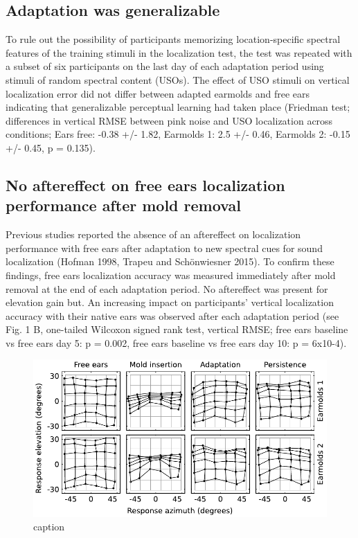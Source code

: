  \subsection{Adaptation was generalizable}

To rule out the possibility of participants memorizing location-specific spectral features of the training stimuli in the localization test, the test was repeated with a subset of six participants on the last day of each adaptation period using stimuli of random spectral content (USOs). The effect of USO stimuli on vertical localization error did not differ between adapted earmolds and free ears indicating that generalizable perceptual learning had taken place (Friedman test; differences in vertical RMSE between pink noise and USO localization across conditions; Ears free: -0.38 +/- 1.82, Earmolds 1: 2.5 +/- 0.46, Earmolds 2: -0.15 +/- 0.45, p = 0.135).

 \subsection{No aftereffect on free ears localization performance after mold removal}

Previous studies reported the absence of an aftereffect on localization performance with free ears after adaptation to new spectral cues for sound localization (Hofman 1998, Trapeu and Schönwiesner 2015). To confirm these findings, free ears localization accuracy was measured immediately after mold removal at the end of each adaptation period. 
No aftereffect was present for elevation gain but. An increasing impact on participants’ vertical localization accuracy with their native ears was observed after each adaptation period (see Fig. 1 B, one-tailed Wilcoxon signed rank test, vertical RMSE; free ears baseline vs free ears day 5: p = 0.002, free ears baseline vs free ears day 10: p = 6x10-4). 

 \begin{figure}[hb]
	\includegraphics[width=14cm, left]{../Results/figures/fig7/fig7}
	\caption{caption}
        \label{fig:response_evo}
\end{figure}


